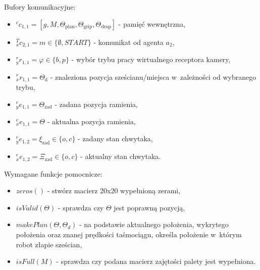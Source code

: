 Bufory komunikacyjne:
\begin{itemize}
    \item ${}^{c}c_{1,1} = [g, M, \Theta_{\mathrm{plan}}, \Theta_{\mathrm{grip}}, \Theta_{\mathrm{drop}}]$ - pamięć wewnętrzna,
    
    \item ${}^{T}_{x}c_{2,1} = m \in \{ \emptyset, START \}$ - komunikat od agenta $a_{2}$,
    
    \item ${}^{r}_{y}r_{1,1} = \varphi \in \{b, p\}$ - wybór trybu pracy wirtualnego receptora kamery,
    \item ${}^{r}_{x}r_{1,1} = \Theta_{\mathrm{d}}$ - znaleziona pozycja sześcianu/miejsca w~zależności od wybranego trybu,

    \item ${}^{e}_{y}e_{1,1} = \Theta_{\mathrm{zad}}$ - zadana pozycja ramienia,
    \item ${}^{e}_{x}e_{1,1} = \Theta$ - aktualna pozycja ramienia,

    \item ${}^{e}_{y}e_{1,2} = \xi_{\mathrm{zad}} \in \{o, c\}$ - zadany stan chwytaka,
    \item ${}^{e}_{x}e_{1,2} = \Xi_{\mathrm{zad}} \in \{o, c\}$ - aktualny stan chwytaka.
\end{itemize}

Wymagane funkcje pomocnicze:
\begin{itemize}
    \item $zeros()$ - stwórz macierz 20x20 wypełnioną zerami,
    \item $isValid(\Theta)$ - sprawdza czy $\Theta$ jest poprawną pozycją,
    \item $makePlan(\Theta, \Theta_{d})$ - na podstawie aktualnego położenia, wykrytego położenia oraz znanej prędkości taśmociągu, określa położenie w~którym robot złapie sześcian, 
    \item $isFull(M)$ - sprawdza czy podana macierz zajętości palety jest wypełniona.
\end{itemize}

